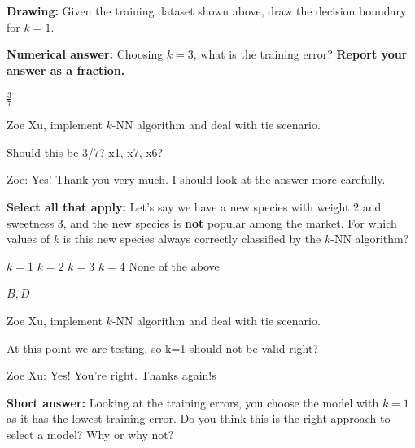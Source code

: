 \begin{parts}
\begin{subparts}
    \subpart[5] \textbf{Drawing:} Given the training dataset shown above, draw the decision boundary for $k=1$.
    
    
    \subpart[2] \textbf{Numerical answer:} Choosing $k = 3$, what is the training error? \textbf{Report your answer as a fraction.}
    \begin{tcolorbox}[fit,height=1cm, width=2cm, blank, borderline={1pt}{-2pt}]
    \end{tcolorbox}
    \begin{soln}
    $\frac{3}{7}$
    \end{soln}
    \begin{qauthor}
        Zoe Xu, implement $k$-NN algorithm and deal with tie scenario.
    \end{qauthor}

\begin{qtester}
    Should this be 3/7? x1, x7, x6?
    
    Zoe: Yes! Thank you very much. I should look at the answer more carefully.
\end{qtester}
    
    \subpart[4] \textbf{Select all that apply:} Let's say we have a new species with weight 2 and sweetness 3, and the new species is \textbf{not} popular among the market. For which values of $k$ is this new species always correctly classified by the $k$-NN algorithm?
\checkboxchar{$\Box$} \checkedchar{$\blacksquare$} %
    \begin{checkboxes}
     \choice $k = 1$
     \choice $k = 2$
     \choice $k = 3$
     \choice $k = 4$
     \choice None of the above
    \end{checkboxes}
    \begin{soln}
    $B, D$
    \end{soln}
    \begin{qauthor}
        Zoe Xu, implement $k$-NN algorithm and deal with tie scenario.
    \end{qauthor}
    \begin{qtester}
    At this point we are testing, so k=1 should not be valid right? 

    Zoe Xu: Yes! You're right. Thanks again!s
    \end{qtester}

    \subpart[2] \textbf{Short answer:} Looking at the training errors, you choose the model with $k = 1$ as it has the lowest training error. Do you think this is the right approach to select a model? Why or why not?


\end{subparts}
\end{parts}
